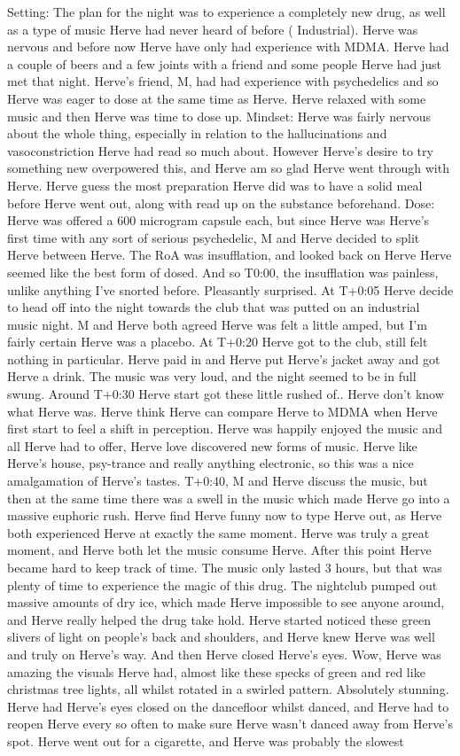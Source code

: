 \documentclass[12pt]{book}
\begin{document}
Setting: The plan for the night was to experience a completely new drug, as well as a type of music Herve had never heard of before ( Industrial). Herve was nervous and before now Herve have only had experience with MDMA. Herve had a couple of beers and a few joints with a friend and some people Herve had just met that night. Herve's friend, M, had had experience with psychedelics and so Herve was eager to dose at the same time as Herve. Herve relaxed with some music and then Herve was time to dose up. Mindset: Herve was fairly nervous about the whole thing, especially in relation to the hallucinations and vasoconstriction Herve had read so much about. However Herve's desire to try something new overpowered this, and Herve am so glad Herve went through with Herve. Herve guess the most preparation Herve did was to have a solid meal before Herve went out, along with read up on the substance beforehand. Dose: Herve was offered a 600 microgram capsule each, but since Herve was Herve's first time with any sort of serious psychedelic, M and Herve decided to split Herve between Herve. The RoA was insufflation, and looked back on Herve Herve seemed like the best form of dosed. And so T0:00, the insufflation was painless, unlike anything I've snorted before. Pleasantly surprised. At T+0:05 Herve decide to head off into the night towards the club that was putted on an industrial music night. M and Herve both agreed Herve was felt a little amped, but I'm fairly certain Herve was a placebo. At T+0:20 Herve got to the club, still felt nothing in particular. Herve paid in and Herve put Herve's jacket away and got Herve a drink. The music was very loud, and the night seemed to be in full swung. Around T+0:30 Herve start got these little rushed of.. Herve don't know what Herve was. Herve think Herve can compare Herve to MDMA when Herve first start to feel a shift in perception. Herve was happily enjoyed the music and all Herve had to offer, Herve love discovered new forms of music. Herve like Herve's house, psy-trance and really anything electronic, so this was a nice amalgamation of Herve's tastes. T+0:40, M and Herve discuss the music, but then at the same time there was a swell in the music which made Herve go into a massive euphoric rush. Herve find Herve funny now to type Herve out, as Herve both experienced Herve at exactly the same moment. Herve was truly a great moment, and Herve both let the music consume Herve. After this point Herve became hard to keep track of time. The music only lasted 3 hours, but that was plenty of time to experience the magic of this drug. The nightclub pumped out massive amounts of dry ice, which made Herve impossible to see anyone around, and Herve really helped the drug take hold. Herve started noticed these green slivers of light on people's back and shoulders, and Herve knew Herve was well and truly on Herve's way. And then Herve closed Herve's eyes. Wow, Herve was amazing the visuals Herve had, almost like these specks of green and red like christmas tree lights, all whilst rotated in a swirled pattern. Absolutely stunning. Herve had Herve's eyes closed on the dancefloor whilst danced, and Herve had to reopen Herve every so often to make sure Herve wasn't danced away from Herve's spot. Herve went out for a cigarette, and Herve was probably the slowest 
\end{document}
